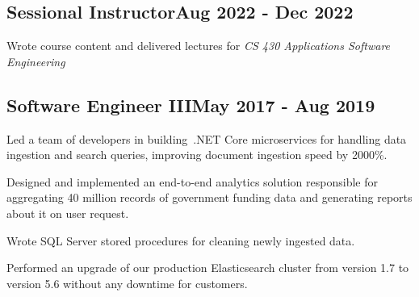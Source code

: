 \documentclass[a4paper,12pt]{article}
\begin{document}


\vspace*{10pt}
\subsection{{Sessional Instructor}\hfill Aug 2022 - Dec 2022}
\vspace*{2pt}
Wrote course content and delivered lectures for \textit{CS 430 Applications Software Engineering}

\vspace*{10pt}
\subsection{{Software Engineer III}\hfill May 2017 - Aug 2019}
\begin{zitemize}
\item Led a team of developers in building~.NET Core microservices for handling data ingestion and search queries, improving document ingestion
speed by 2000\%.
\item Designed and implemented an end-to-end analytics solution responsible for aggregating 40 million records of government funding data and
generating reports about it on user request.
\item Wrote SQL Server stored procedures for cleaning newly ingested data.
\item Performed an upgrade of our production Elasticsearch cluster from version 1.7 to version 5.6 without any downtime for customers.
\end{zitemize}

\end{document}
